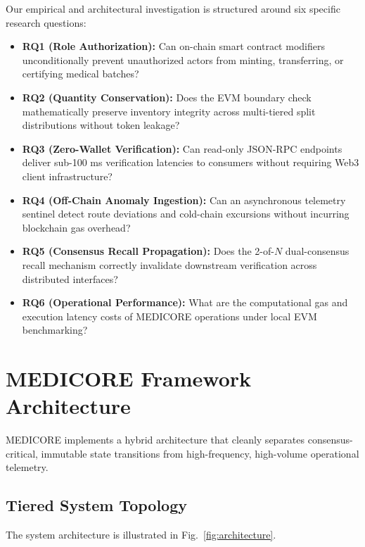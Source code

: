 \documentclass[pdflatex,sn-mathphys-num]{sn-jnl}
\theoremstyle{thmstyleone}
\theoremstyle{thmstyletwo}
\theoremstyle{thmstylethree}
\begin{document}
Our empirical and architectural investigation is structured around six specific research questions:
\begin{itemize}
    \item \textbf{RQ1 (Role Authorization):} Can on-chain smart contract modifiers unconditionally prevent unauthorized actors from minting, transferring, or certifying medical batches?
    \item \textbf{RQ2 (Quantity Conservation):} Does the EVM boundary check mathematically preserve inventory integrity across multi-tiered split distributions without token leakage?
    \item \textbf{RQ3 (Zero-Wallet Verification):} Can read-only JSON-RPC endpoints deliver sub-100 ms verification latencies to consumers without requiring Web3 client infrastructure?
    \item \textbf{RQ4 (Off-Chain Anomaly Ingestion):} Can an asynchronous telemetry sentinel detect route deviations and cold-chain excursions without incurring blockchain gas overhead?
    \item \textbf{RQ5 (Consensus Recall Propagation):} Does the 2-of-$N$ dual-consensus recall mechanism correctly invalidate downstream verification across distributed interfaces?
    \item \textbf{RQ6 (Operational Performance):} What are the computational gas and execution latency costs of MEDICORE operations under local EVM benchmarking?
\end{itemize}


\section{MEDICORE Framework Architecture}\label{sec:architecture}

MEDICORE implements a hybrid architecture that cleanly separates consensus-critical, immutable state transitions from high-frequency, high-volume operational telemetry.

\subsection{Tiered System Topology}

The system architecture is illustrated in Fig.~\ref{fig:architecture}.
\end{document}
